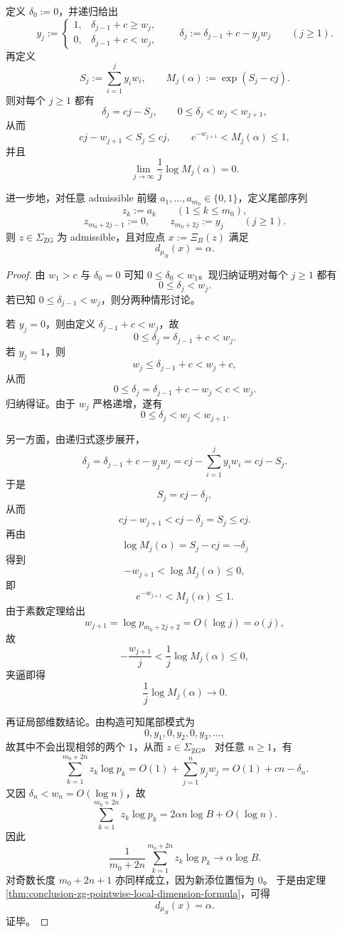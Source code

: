 \begin{theorem}\label{thm:conclusion-prime-log-calibration-zero-lyapunov-product}
定义 \(\delta_0:=0\)，并递归给出
\[
y_j:=
\begin{cases}
1,& \delta_{j-1}+c\ge w_j,\\
0,& \delta_{j-1}+c<w_j,
\end{cases}
\qquad
\delta_j:=\delta_{j-1}+c-y_jw_j
\qquad (j\ge 1).
\]
再定义
\[
S_j:=\sum_{i=1}^{j}y_iw_i,
\qquad
M_j(\alpha):=\exp(S_j-cj).
\]
则对每个 \(j\ge 1\) 都有
\[
\delta_j=cj-S_j,
\qquad
0\le \delta_j<w_j<w_{j+1},
\]
从而
\[
cj-w_{j+1}<S_j\le cj,
\qquad
e^{-w_{j+1}}<M_j(\alpha)\le 1,
\]
并且
\[
\lim_{j\to\infty}\frac{1}{j}\log M_j(\alpha)=0.
\]

进一步地，对任意 admissible 前缀 \(a_1,\dots,a_{m_0}\in\{0,1\}\)，定义尾部序列
\[
z_k:=a_k\qquad(1\le k\le m_0),
\]
\[
z_{m_0+2j-1}:=0,
\qquad
z_{m_0+2j}:=y_j
\qquad(j\ge 1).
\]
则 \(z\in\Sigma_{\mathrm{ZG}}\) 为 admissible，且对应点 \(x:=\Xi_B(z)\) 满足
\[
d_{\mu_B}(x)=\alpha.
\]
\end{theorem}
\begin{proof}
由 \(w_1>c\) 与 \(\delta_0=0\) 可知 \(0\le \delta_0<w_1\)。现归纳证明对每个 \(j\ge 1\) 都有
\[
0\le \delta_j<w_j.
\]
若已知 \(0\le \delta_{j-1}<w_j\)，则分两种情形讨论。

若 \(y_j=0\)，则由定义 \(\delta_{j-1}+c<w_j\)，故
\[
0\le \delta_j=\delta_{j-1}+c<w_j.
\]
若 \(y_j=1\)，则
\[
w_j\le \delta_{j-1}+c<w_j+c,
\]
从而
\[
0\le \delta_j=\delta_{j-1}+c-w_j<c<w_j.
\]
归纳得证。由于 \(w_j\) 严格递增，遂有
\[
0\le \delta_j<w_j<w_{j+1}.
\]

另一方面，由递归式逐步展开，
\[
\delta_j
=
\delta_{j-1}+c-y_jw_j
=
cj-\sum_{i=1}^{j}y_iw_i
=
cj-S_j.
\]
于是
\[
S_j=cj-\delta_j,
\]
从而
\[
cj-w_{j+1}<cj-\delta_j=S_j\le cj.
\]
再由
\[
\log M_j(\alpha)=S_j-cj=-\delta_j
\]
得到
\[
-w_{j+1}<\log M_j(\alpha)\le 0,
\]
即
\[
e^{-w_{j+1}}<M_j(\alpha)\le 1.
\]
由于素数定理给出
\[
w_{j+1}=\log p_{m_0+2j+2}=O(\log j)=o(j),
\]
故
\[
-\frac{w_{j+1}}{j}
<
\frac{1}{j}\log M_j(\alpha)
\le 0,
\]
夹逼即得
\[
\frac{1}{j}\log M_j(\alpha)\longrightarrow 0.
\]

再证局部维数结论。由构造可知尾部模式为
\[
0,y_1,0,y_2,0,y_3,\dots,
\]
故其中不会出现相邻的两个 \(1\)，从而 \(z\in\Sigma_{\mathrm{ZG}}\)。
对任意 \(n\ge 1\)，有
\[
\sum_{k=1}^{m_0+2n}z_k\log p_k
=
O(1)+\sum_{j=1}^{n}y_jw_j
=
O(1)+cn-\delta_n.
\]
又因 \(\delta_n<w_n=O(\log n)\)，故
\[
\sum_{k=1}^{m_0+2n}z_k\log p_k
=
2\alpha n\log B+O(\log n).
\]
因此
\[
\frac{1}{m_0+2n}\sum_{k=1}^{m_0+2n}z_k\log p_k
\longrightarrow
\alpha\log B.
\]
对奇数长度 \(m_0+2n+1\) 亦同样成立，因为新添位置恒为 \(0\)。
于是由定理 \ref{thm:conclusion-zg-pointwise-local-dimension-formula}，可得
\[
d_{\mu_B}(x)=\alpha.
\]
证毕。
\end{proof}

